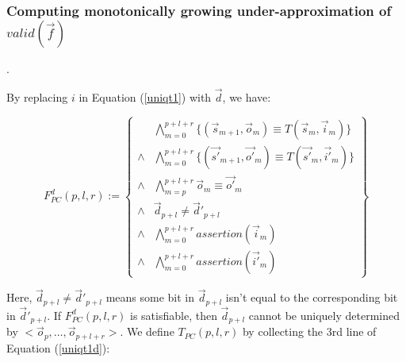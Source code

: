 \documentclass[runningheads,a4paper,orivec]{llncs}
\begin{document}
% 

\subsubsection{\textbf{Computing monotonically growing under-approximation of $valid(\vec{f})$}}\label{subsub_nonloop}.



By replacing $i$ in Equation (\ref{uniqt1}) with $\vec{d}$,
we have:

\begin{equation}\label{uniqt1d}
F^d_{PC}(p,l,r):=
\left\{
\begin{array}{cc}
&\bigwedge_{m=0}^{p+l+r}
\{
(\vec{s}_{m+1},\vec{o}_m)\equiv T(\vec{s}_m,\vec{i}_m)
\}
\\
\wedge&\bigwedge_{m=0}^{p+l+r}
\{
(\vec{s'}_{m+1},\vec{o'}_m)\equiv T(\vec{s'}_m,\vec{i'}_m)
\}
\\
\wedge&\bigwedge_{m=p}^{p+l+r}\vec{o}_m\equiv \vec{o'}_m \\
\wedge& \vec{d}_{p+l}\ne \vec{d}'_{p+l} \\
\wedge&\bigwedge_{m=0}^{p+l+r}assertion(\vec{i}_m) \\
\wedge&\bigwedge_{m=0}^{p+l+r}assertion(\vec{i'}_m) 
\end{array}
\right\}
\end{equation}

Here,
$\vec{d}_{p+l}\ne \vec{d}'_{p+l}$ means some bit in $\vec{d}_{p+l}$ 
isn't equal to the corresponding bit in $\vec{d}'_{p+l}$.
If $F^d_{PC}(p,l,r)$ is satisfiable,
then $\vec{d}_{p+l}$ cannot be uniquely determined by $<\vec{o}_p,\dots,\vec{o}_{p+l+r}>$.
We define $T_{PC}(p,l,r)$ by collecting the 3rd line of Equation (\ref{uniqt1d}):
\end{document}
